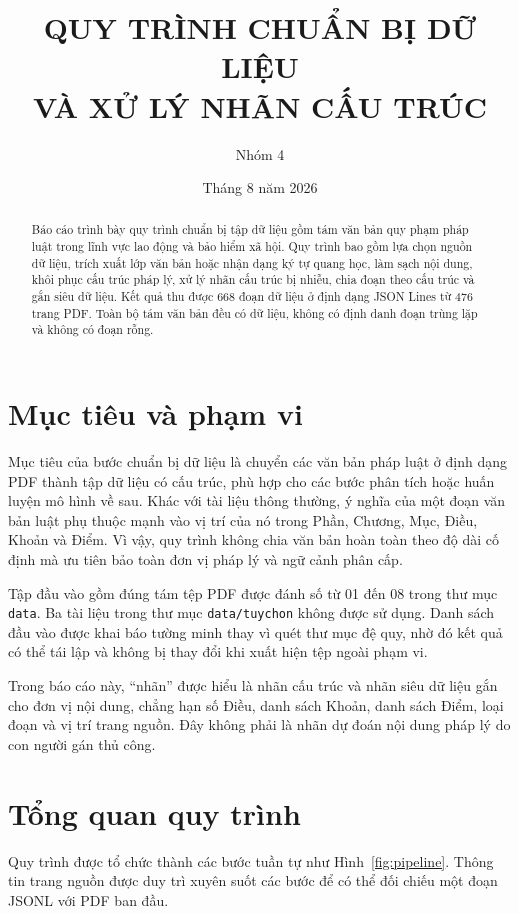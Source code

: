 \documentclass[12pt,a4paper]{article}
\title{\textbf{QUY TRÌNH CHUẨN BỊ DỮ LIỆU\\VÀ XỬ LÝ NHÃN CẤU TRÚC}}
\author{Nhóm 4}
\date{Tháng 8 năm 2026}
\newcommand{\code}[1]{\texttt{#1}}
\begin{document}
\maketitle

\begin{abstract}
Báo cáo trình bày quy trình chuẩn bị tập dữ liệu gồm tám văn bản quy phạm pháp
luật trong lĩnh vực lao động và bảo hiểm xã hội. Quy trình bao gồm lựa chọn nguồn
dữ liệu, trích xuất lớp văn bản hoặc nhận dạng ký tự quang học, làm sạch nội dung,
khôi phục cấu trúc pháp lý, xử lý nhãn cấu trúc bị nhiễu, chia đoạn theo cấu trúc
và gắn siêu dữ liệu. Kết quả thu được 668 đoạn dữ liệu ở định dạng JSON Lines từ
476 trang PDF. Toàn bộ tám văn bản đều có dữ liệu, không có định danh đoạn trùng
lặp và không có đoạn rỗng.
\end{abstract}

\tableofcontents
\newpage

\section{Mục tiêu và phạm vi}

Mục tiêu của bước chuẩn bị dữ liệu là chuyển các văn bản pháp luật ở định dạng
PDF thành tập dữ liệu có cấu trúc, phù hợp cho các bước phân tích hoặc huấn luyện
mô hình về sau. Khác với tài liệu thông thường, ý nghĩa của một đoạn văn bản luật
phụ thuộc mạnh vào vị trí của nó trong Phần, Chương, Mục, Điều, Khoản và Điểm.
Vì vậy, quy trình không chia văn bản hoàn toàn theo độ dài cố định mà ưu tiên bảo
toàn đơn vị pháp lý và ngữ cảnh phân cấp.

Tập đầu vào gồm đúng tám tệp PDF được đánh số từ 01 đến 08 trong thư mục
\code{data}. Ba tài liệu trong thư mục \code{data/tuychon} không được sử dụng.
Danh sách đầu vào được khai báo tường minh thay vì quét thư mục đệ quy, nhờ đó
kết quả có thể tái lập và không bị thay đổi khi xuất hiện tệp ngoài phạm vi.

Trong báo cáo này, ``nhãn'' được hiểu là nhãn cấu trúc và nhãn siêu dữ liệu gắn
cho đơn vị nội dung, chẳng hạn số Điều, danh sách Khoản, danh sách Điểm, loại đoạn
và vị trí trang nguồn. Đây không phải là nhãn dự đoán nội dung pháp lý do con
người gán thủ công.

\section{Tổng quan quy trình}

Quy trình được tổ chức thành các bước tuần tự như Hình~\ref{fig:pipeline}.
Thông tin trang nguồn được duy trì xuyên suốt các bước để có thể đối chiếu một
đoạn JSONL với PDF ban đầu.
\end{document}
